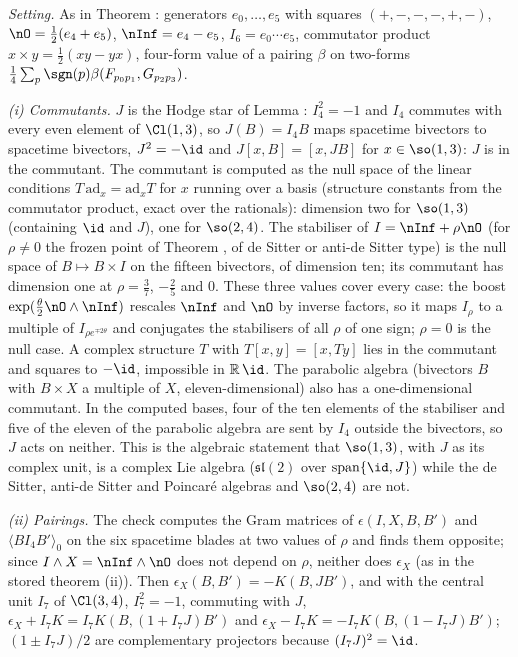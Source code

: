 \emph{Setting.} As in Theorem : generators $e_{0}, \dots, e_{5}$ with squares $(+,-,-,-,+,-)$, $\nO = \tfrac12(e_{4} + e_{5})$, $\nInf = e_{4} - e_{5}$, $I_{6} = e_{0}\cdots e_{5}$, commutator product $x \times y = \tfrac12(xy - yx)$, four-form value of a pairing $\beta$ on two-forms $\tfrac14\sum_{p}\sgn(p)\beta(F_{p_{0}p_{1}}, G_{p_{2}p_{3}})$.

\emph{(i) Commutants.} $J$ is the Hodge star of Lemma : $I_{4}^{2} = -1$ and $I_{4}$ commutes with every even element of $\Cl(1,3)$, so $J(B) = I_{4}B$ maps spacetime bivectors to spacetime bivectors, $J^{2} = -\id$ and $J[x, B] = [x, JB]$ for $x \in \so(1,3)$: $J$ is in the commutant. The commutant is computed as the null space of the linear conditions $T\,\mathrm{ad}_{x} = \mathrm{ad}_{x}T$ for $x$ running over a basis (structure constants from the commutator product, exact over the rationals): dimension two for $\so(1,3)$ (containing $\id$ and $J$), one for $\so(2,4)$. The stabiliser of $I = \nInf + \rho\nO$ (for $\rho \neq 0$ the frozen point of Theorem , of de Sitter or anti-de Sitter type) is the null space of $B \mapsto B \times I$ on the fifteen bivectors, of dimension ten; its commutant has dimension one at $\rho = \tfrac37$, $-\tfrac25$ and $0$. These three values cover every case: the boost $\exp(\tfrac{\theta}{2}\nO\wedge\nInf)$ rescales $\nInf$ and $\nO$ by inverse factors, so it maps $I_{\rho}$ to a multiple of $I_{\rho e^{\mp 2\theta}}$ and conjugates the stabilisers of all $\rho$ of one sign; $\rho = 0$ is the null case. A complex structure $T$ with $T[x, y] = [x, Ty]$ lies in the commutant and squares to $-\id$, impossible in $\mathbb{R}\,\id$. The parabolic algebra (bivectors $B$ with $B \times X$ a multiple of $X$, eleven-dimensional) also has a one-dimensional commutant. In the computed bases, four of the ten elements of the stabiliser and five of the eleven of the parabolic algebra are sent by $I_{4}$ outside the bivectors, so $J$ acts on neither. This is the algebraic statement that $\so(1,3)$, with $J$ as its complex unit, is a complex Lie algebra ($\mathfrak{sl}(2)$ over $\mathrm{span}\{\id, J\}$) while the de Sitter, anti-de Sitter and Poincar\'e algebras and $\so(2,4)$ are not.

\emph{(ii) Pairings.} The check computes the Gram matrices of $\epsilon(I, X, B, B')$ and $\langle B I_{4} B'\rangle_{0}$ on the six spacetime blades at two values of $\rho$ and finds them opposite; since $I \wedge X = \nInf \wedge \nO$ does not depend on $\rho$, neither does $\epsilon_{X}$ (as in the stored theorem (ii)). Then $\epsilon_{X}(B, B') = -K(B, JB')$, and with the central unit $I_{7}$ of $\Cl(3,4)$, $I_{7}^{2} = -1$, commuting with $J$, $\epsilon_{X} + I_{7}K = I_{7}K(B, (1 + I_{7}J)B')$ and $\epsilon_{X} - I_{7}K = -I_{7}K(B, (1 - I_{7}J)B')$; $(1 \pm I_{7}J)/2$ are complementary projectors because $(I_{7}J)^{2} = \id$.

